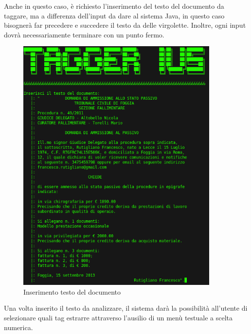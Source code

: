 Anche in questo caso, è richiesto l'inserimento del testo del documento da taggare, ma a differenza dell'input da dare al sistema Java, in questo caso bisognerà far precedere e succedere il testo da delle virgolette.
Inoltre, ogni input dovrà necessariamente terminare con un punto fermo.

\begin{figure}[H]
	\centering
	\includegraphics[width=0.9\textwidth]{img/interfaces/CLI-document.png}
	\caption[Schermata CLI document]{Inserimento testo del documento}
	\label{CLI-doc}
\end{figure}

Una volta inserito il testo da analizzare, il sistema darà la possibilità all'utente di selezionare quali tag estrarre attraverso l'ausilio di un menù testuale a scelta numerica.

